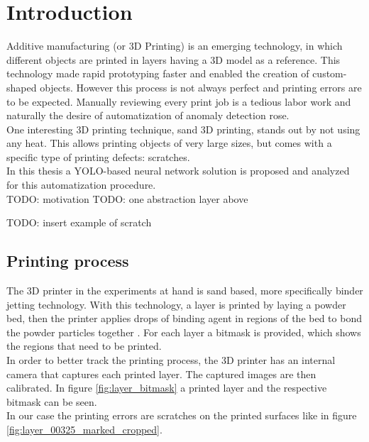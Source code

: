 \section{Introduction}



Additive manufacturing (or 3D Printing) is an emerging technology, in which
different objects are printed in layers having a 3D model as a reference. This technology made rapid prototyping faster and enabled the creation of custom-shaped objects. However this process is not always perfect and printing errors are to be expected. Manually reviewing every print job is a tedious labor work and naturally the desire of automatization of anomaly detection rose. \\
One interesting 3D printing technique, sand 3D printing, stands out by not using any heat. This allows printing objects of very large sizes, but comes with a specific type of printing defects: scratches. \\
In this thesis a YOLO-based neural network solution is proposed and analyzed for this automatization procedure. \\
TODO: motivation
TODO: one abstraction layer above

TODO: insert example of scratch


\subsection{Printing process}
The 3D printer in the experiments at hand is sand based, more specifically binder jetting technology. With this technology, a layer is printed by laying a powder bed, then the printer applies drops of binding agent in regions of the bed to bond the powder particles together \cite{binder_jetting}. For each layer a bitmask is provided, which shows the regions that need to be printed. \\
In order to better track the printing process, the 3D printer has an internal camera that captures each printed layer. The captured images are then calibrated. In figure \ref{fig:layer_bitmask} a printed layer and the respective bitmask can be seen.\\
In our case the printing errors are scratches on the printed surfaces like in figure \ref{fig:layer_00325_marked_cropped}.


